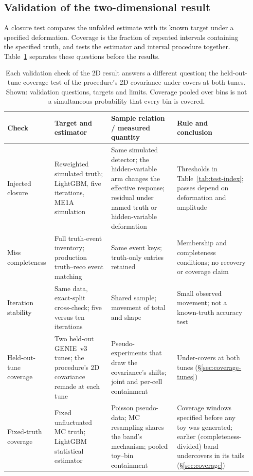 \subsection{Validation of the two-dimensional result}
\label{sec:validation}

A closure test compares the unfolded estimate with its known target under a specified deformation. Coverage is the fraction of repeated intervals containing the specified truth, and tests the estimator and interval procedure together. Table~\ref{tab:validation-questions} separates these questions before the results.

\begin{table}[H]
\caption[Validation questions for the 2D result]{Each validation check of the 2D result answers a different question; the held-out-tune coverage test of the procedure's 2D covariance under-covers at both tunes. Shown: validation questions, targets and limits. Coverage pooled over bins is not a simultaneous probability that every bin is covered.}
\label{tab:validation-questions}
\centering\footnotesize
\begin{tabular}{@{}p{}p{}p{}p{}@{}}
\toprule
Check & Target and estimator & Sample relation / measured quantity & Rule and conclusion \\
\midrule
Injected closure & Reweighted simulated truth; LightGBM, five iterations, ME1A simulation & Same simulated detector; the hidden-variable arm changes the effective response; residual under named truth or hidden-variable deformation & Thresholds in Table~\ref{tab:test-index}; passes depend on deformation and amplitude \\
\addlinespace
Miss completeness & Full truth-event inventory; production truth--reco event matching & Same event keys; truth-only entries retained & Membership and completeness conditions; no recovery or coverage claim \\
\addlinespace
Iteration stability & Same data, exact-split cross-check; five versus ten iterations & Shared sample; movement of total and shape & Small observed movement; not a known-truth accuracy test \\
\addlinespace
Held-out-tune coverage & Two held-out GENIE~v3 tunes; the procedure's 2D covariance remade at each tune & Pseudo-experiments that draw the covariance's shifts; joint and per-cell containment & Under-covers at both tunes (\S\ref{sec:coverage-tunes}) \\
\addlinespace
Fixed-truth coverage & Fixed unfluctuated MC truth; LightGBM statistical estimator & Poisson pseudo-data; MC resampling shares the band's mechanism; pooled toy--bin containment & Coverage windows specified before any toy was generated; earlier (completeness-divided) band undercovers in its tails (\S\ref{sec:coverage}) \\
\bottomrule
\end{tabular}
\end{table}

